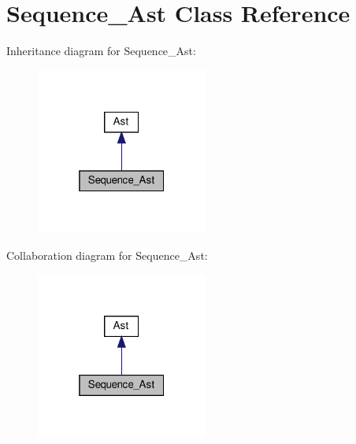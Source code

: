 \hypertarget{classSequence__Ast}{}\section{Sequence\+\_\+\+Ast Class Reference}
\label{classSequence__Ast}


Inheritance diagram for Sequence\+\_\+\+Ast\+:
\nopagebreak
\begin{figure}[H]
\begin{center}
\leavevmode
\includegraphics[width=160pt]{classSequence__Ast__inherit__graph}
\end{center}
\end{figure}


Collaboration diagram for Sequence\+\_\+\+Ast\+:
\nopagebreak
\begin{figure}[H]
\begin{center}
\leavevmode
\includegraphics[width=160pt]{classSequence__Ast__coll__graph}
\end{center}
\end{figure}
